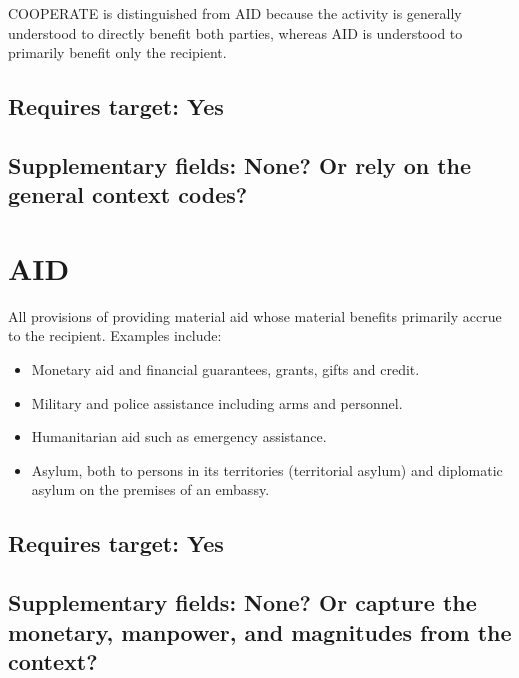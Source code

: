 \documentclass[11pt]{report}
\newcommand{\plcat}[1]{\textsf{#1}}
\begin{document}
\noindent \plcat{COOPERATE} is distinguished from \plcat{AID} because the activity is generally understood to directly benefit both parties, whereas  \plcat{AID} is understood to primarily benefit only the recipient. 

\subsection{Requires target: Yes}

\subsection{Supplementary fields: None? Or rely on the general context codes?}


\newpage

\section{AID}

All provisions of providing material aid whose material benefits primarily accrue to the recipient. Examples include: 

\begin{itemize}

\item Monetary aid and financial guarantees, grants, gifts and credit.

\item Military and police assistance including arms and personnel.

\item Humanitarian aid such as emergency assistance.

\item Asylum, both to persons in its territories (territorial asylum) and diplomatic asylum on the premises of an embassy.

\end{itemize}

\subsection{Requires target: Yes}

\subsection{Supplementary fields: None? Or capture the monetary, manpower, and magnitudes from the context?}


\bigskip  
\end{document}
